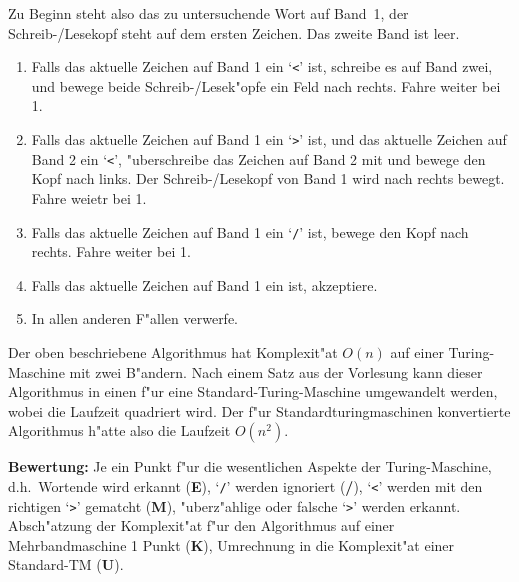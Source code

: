 {\begin{loesung}
\begin{teilaufgaben}
Zu Beginn steht also das zu untersuchende Wort auf Band~1,
der Schreib-/Lesekopf steht auf dem ersten Zeichen.
Das zweite Band ist leer.
{
\renewcommand{\theenumii}{\arabic{enumii}}
\renewcommand{\labelenumii}{\theenumii.}
\begin{enumerate}
\item Falls das aktuelle Zeichen auf Band 1 ein `{\tt <}' ist,
schreibe es auf Band zwei, und bewege beide Schreib-/Lesek"opfe ein
Feld nach rechts. Fahre weiter bei 1.
\item Falls das aktuelle Zeichen auf Band 1 ein `{\tt >}' ist,
und das aktuelle Zeichen auf Band 2 ein `{\tt <}', "uberschreibe
das Zeichen auf Band 2 mit \textvisiblespace und bewege den Kopf
nach links. Der Schreib-/Lesekopf von Band 1 wird nach rechts bewegt.
Fahre weietr bei 1.
\item Falls das aktuelle Zeichen auf Band 1 ein `{\tt /}' ist, bewege
den Kopf nach rechts.
Fahre weiter bei 1.
\item Falls das aktuelle Zeichen auf Band 1 ein \textvisiblespace{} ist,
akzeptiere.
\item In allen anderen F"allen verwerfe.
\end{enumerate}
}
\item
Der oben beschriebene Algorithmus hat Komplexit"at $O(n)$ auf einer 
Turing-Maschine mit zwei B"andern. Nach einem Satz aus der Vorlesung
kann dieser Algorithmus in einen f"ur eine Standard-Turing-Maschine
umgewandelt werden, wobei die Laufzeit quadriert wird. Der f"ur 
Standardturingmaschinen konvertierte Algorithmus h"atte also die
Laufzeit $O(n^2)$.
\end{teilaufgaben}
\end{loesung}
{\bf Bewertung:}
Je ein Punkt f"ur die wesentlichen Aspekte der Turing-Maschine,
d.h.~Wortende wird erkannt ({\bf E}), `{\tt /}' werden ignoriert
({\bf /}), `{\tt <}' werden mit den richtigen `{\tt >}' gematcht ({\bf M}),
"uberz"ahlige oder falsche `{\tt >}' werden erkannt.
Absch"atzung der Komplexit"at f"ur den Algorithmus auf einer
Mehrbandmaschine 1 Punkt ({\bf K}), Umrechnung in die Komplexit"at
einer Standard-TM ({\bf U}).
}{ }

